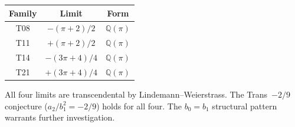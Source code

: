 \documentclass[11pt]{amsart}
\theoremstyle{definition}
\theoremstyle{remark}
\begin{document}
\begin{center}
\begin{tabular}{ccc}
\hline
Family & Limit & Form \\
\hline
T08 & $-(\pi+2)/2$  & $\mathbb{Q}(\pi)$ \\
T11 & $+(\pi+2)/2$  & $\mathbb{Q}(\pi)$ \\
T14 & $-(3\pi+4)/4$ & $\mathbb{Q}(\pi)$ \\
T21 & $+(3\pi+4)/4$ & $\mathbb{Q}(\pi)$ \\
\hline
\end{tabular}
\end{center}

All four limits are transcendental by Lindemann--Weierstrass.  The
Trans~$-2/9$ conjecture ($a_2/b_1^2 = -2/9$) holds for all four.  The
$b_0 = b_1$ structural pattern warrants further investigation.
\end{document}
